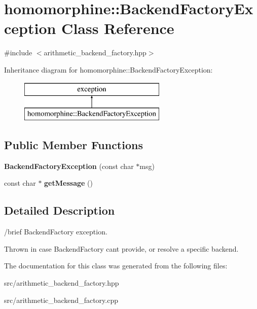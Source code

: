 \hypertarget{classhomomorphine_1_1_backend_factory_exception}{}\section{homomorphine\+::Backend\+Factory\+Exception Class Reference}
\label{classhomomorphine_1_1_backend_factory_exception}


{\ttfamily \#include $<$arithmetic\+\_\+backend\+\_\+factory.\+hpp$>$}

Inheritance diagram for homomorphine\+::Backend\+Factory\+Exception\+:\begin{figure}[H]
\begin{center}
\leavevmode
\includegraphics[height=2.000000cm]{classhomomorphine_1_1_backend_factory_exception}
\end{center}
\end{figure}
\subsection*{Public Member Functions}
\begin{DoxyCompactItemize}
\item 
\mbox{\label{classhomomorphine_1_1_backend_factory_exception_a3a3558dd9e514b26d980d7a5d4ea5b94}} 
{\bfseries Backend\+Factory\+Exception} (const char $\ast$msg)
\item 
\mbox{\label{classhomomorphine_1_1_backend_factory_exception_a8bfd26d7c7a8275dd343c00029ad7cb3}} 
const char $\ast$ {\bfseries get\+Message} ()
\end{DoxyCompactItemize}


\subsection{Detailed Description}
/brief Backend\+Factory exception.

Thrown in case Backend\+Factory can\textquotesingle{}t provide, or resolve a specific backend. 

The documentation for this class was generated from the following files\+:\begin{DoxyCompactItemize}
\item 
src/arithmetic\+\_\+backend\+\_\+factory.\+hpp\item 
src/arithmetic\+\_\+backend\+\_\+factory.\+cpp\end{DoxyCompactItemize}
